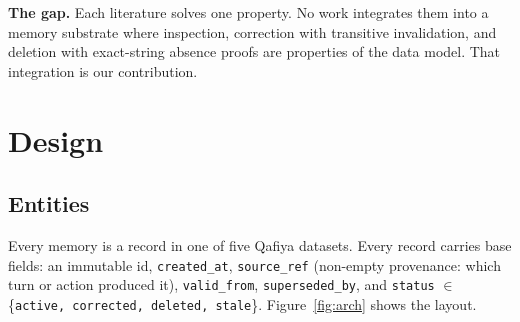 \documentclass[11pt]{article}
\begin{document}
\textbf{The gap.} Each literature solves one property. No work integrates them into a memory substrate where inspection, correction with transitive invalidation, and deletion with exact-string absence proofs are properties of the data model. That integration is our contribution.

\section{Design}
\label{sec:design}

\subsection{Entities}
Every memory is a record in one of five Qafiya datasets. Every record carries base fields: an immutable id, \texttt{created\_at}, \texttt{source\_ref} (non-empty provenance: which turn or action produced it), \texttt{valid\_from}, \texttt{superseded\_by}, and \texttt{status} $\in$ \{\texttt{active, corrected, deleted, stale}\}. Figure~\ref{fig:arch} shows the layout.
\end{document}

